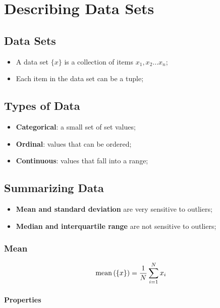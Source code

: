 \chapter{Describing Data Sets}

\section{Data Sets}

  \begin{itemize}
    \item A data set $ \{ x \} $ is a collection of items $ x_{1}, x_{2} ... x_{n} $;
    \item Each item in the data set can be a tuple;
  \end{itemize}
  
\section{Types of Data}

  \begin{itemize}
    \item \textbf{Categorical}: a small set of set values;
    \item \textbf{Ordinal}: values that can be ordered;
    \item \textbf{Continuous}: values that fall into a range;
  \end{itemize}
  
\section{Summarizing Data}

  \begin{itemize}
    \item \textbf{Mean and standard deviation} are very sensitive to outliers;
    \item \textbf{Median and interquartile range} are not sensitive to outliers;
  \end{itemize}

  \subsection{Mean}
  
    \begin{equation}
      \operatorname{mean} \left( \{ x \} \right) = \frac{1}{N} \sum_{i=1}^{N} x_{i}
    \end{equation}
    
    \subsubsection{Properties}
    
